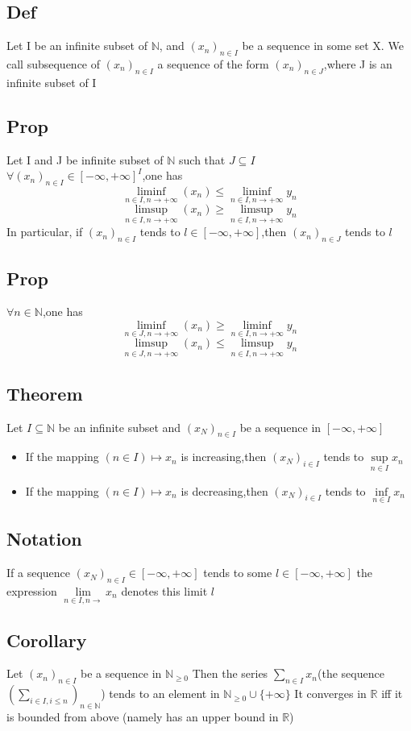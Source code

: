 \documentclass{book}
\begin{document}
\subsection{Def}
Let I be an infinite subset of $\mathbb{N}$, and $(x_n)_{n\in I}$ be a sequence in some set X. We call subsequence of $(x_n)_{n\in I}$ a sequence of the form $(x_n)_{n\in J}$,where J is an infinite subset of I
\subsection{Prop}
Let I and J be infinite subset of $\mathbb{N}$ such that $J\subseteq I$\\
$\forall (x_n)_{n\in I}\in[-\infty,+\infty]^I$,one has $$\liminf\limits_{n\in I,n\rightarrow+\infty}(x_n)\leq\liminf\limits_{n\in I,n\rightarrow+\infty}y_n$$$$\limsup\limits_{n\in I,n\rightarrow+\infty}(x_n)\geq\limsup\limits_{n\in I,n\rightarrow+\infty}y_n$$
In particular, if $(x_n)_{n\in I}$ tends to $l\in[-\infty,+\infty]$,then $(x_n)_{n\in J}$ tends to $l$
\subsection{Prop}
$\forall n\in \mathbb{N} $,one has $$\liminf\limits_{n\in J,n\rightarrow+\infty}(x_n)\geq\liminf\limits_{n\in I,n\rightarrow+\infty}y_n$$$$\limsup\limits_{n\in J,n\rightarrow+\infty}(x_n)\leq\limsup\limits_{n\in I,n\rightarrow+\infty}y_n$$
\subsection{Theorem}
Let $I\subseteq\mathbb{N} $ be an infinite subset and $(x_N)_{n\in I}$ be a sequence in $[-\infty,+\infty]$
\begin{itemize}
    \item If the mapping $(n\in I)\mapsto x_n$ is increasing,then $(x_N)_{i\in I}$ tends to $\sup\limits_{n\in I}x_n$
    \item If the mapping $(n\in I)\mapsto x_n$ is decreasing,then $(x_N)_{i\in I}$ tends to $\inf\limits_{n\in I}x_n$
\end{itemize}
\subsection{Notation}
If a sequence $(x_N)_{n\in I}\in [-\infty,+\infty]$ tends to some $l\in[-\infty,+\infty]$ the expression $\lim\limits_{n\in I,n\rightarrow}x_n$ denotes this limit $l$
\subsection{Corollary}
Let $(x_n)_{n\in I}$ be a sequence in $\mathbb{N} _{\geq0}$ Then the series $\sum\limits_{n\in I}x_n$(the sequence $(\sum\limits_{i\in I,i\leq n})_{n\in \mathbb{N} }$) tends to an element in $\mathbb{N} _{\geq0}\cup\{+\infty\}$ It converges in $\mathbb{R} $ iff it is bounded from above (namely has an upper bound in $\mathbb{R} $)
\end{document}
